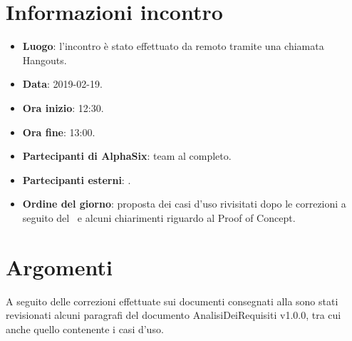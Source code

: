 \newcommand{\documento}{\VE}
\newcommand{\nomedocumentofisico}{VE\_2019-02-19.pdf}
\newcommand{\redazione}{\TG}
\newcommand{\verifica}{\SG}
\newcommand{\approvazione}{\CV}
\newcommand{\versione}{1.0.0}
\newcommand{\uso}{Esterno}
\newcommand{\destinateTo}{\TV, \\ & \RC, \\ & \II}
\newcommand{\datacreazione}{19 febbraio 2019}
\newcommand{\datamodifica}{21 febbraio 2019}
\newcommand{\stato}{Approvato}

\def\TABELLE{false}	%
\def\FIGURE{false} 	%






    

    
    
    \section{Informazioni incontro}
    	\begin{itemize}
    		\item \textbf{Luogo}: l'incontro è stato effettuato da remoto tramite una chiamata Hangouts.
    		\item \textbf{Data}: 2019-02-19.
    		\item \textbf{Ora inizio}: 12:30.
    		\item \textbf{Ora fine}: 13:00.
    		\item \textbf{Partecipanti di AlphaSix}: team al completo.
    		\item \textbf{Partecipanti esterni}: \RC.
    		\item \textbf{Ordine del giorno}: proposta dei casi d'uso rivisitati dopo le correzioni a seguito del \RR~e alcuni chiarimenti riguardo al Proof of Concept.
    		
    	\end{itemize}
    
    \section{Argomenti}
    	A seguito delle correzioni effettuate sui documenti consegnati alla \RR sono stati revisionati alcuni paragrafi del documento AnalisiDeiRequisiti v1.0.0, tra cui anche quello contenente i casi d'uso.
    	
